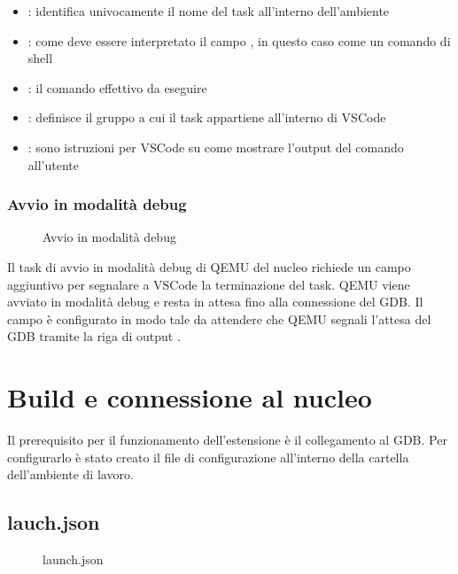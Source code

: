 \begin{itemize}
    \item {}: identifica univocamente il nome del task all'interno dell'ambiente
    \item {}: come deve essere interpretato il campo , in questo caso come un comando di shell
    \item {}: il comando effettivo da eseguire
    \item {}: definisce il gruppo a cui il task appartiene all'interno di VSCode
    \item {}: sono istruzioni per VSCode su come mostrare l'output del comando all'utente 
\end{itemize}

\subsubsection*{Avvio in modalità debug}   

\begin{figure}[H]
    
    \caption{Avvio in modalità debug}
\end{figure}

Il task di avvio in modalità debug di QEMU del nucleo richiede un campo aggiuntivo per segnalare a VSCode la terminazione del task. QEMU viene avviato in modalità debug e resta in attesa fino alla connessione del GDB. Il campo  è configurato in modo tale da attendere che QEMU segnali l'attesa del GDB tramite la riga di output  .

\section{Build e connessione al nucleo}
Il prerequisito per il funzionamento dell'estensione è il collegamento al GDB. Per configurarlo è stato creato il file di configurazione  all'interno della cartella  dell'ambiente di lavoro. 

\subsection*{lauch.json}

\begin{figure}[H]
    
    \caption{launch.json}
\end{figure}

